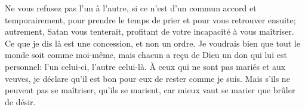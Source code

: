 Ne vous refusez pas l’un à l’autre,
	si ce n’est d’un commun accord et temporairement,
	pour prendre le temps de prier et pour vous retrouver ensuite;
	autrement, Satan vous tenterait,
	profitant de votre incapacité à vous maîtriser.
Ce que je dis là est une concession, et non un ordre.
Je voudrais bien que tout le monde soit comme moi-même,
	mais chacun a reçu de Dieu un don qui lui est personnel:
	l’un celui-ci, l’autre celui-là.
À ceux qui ne sont pas mariés et aux veuves,
	je déclare qu’il est bon pour eux de rester comme je suis.
Mais s’ils ne peuvent pas se maîtriser, qu’ils se marient,
	car mieux vaut se marier que brûler de désir.

